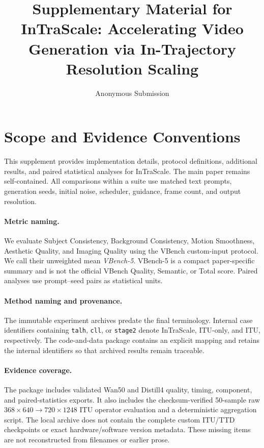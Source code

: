 \documentclass[letterpaper]{article}
\title{Supplementary Material for\\
InTraScale: Accelerating Video Generation via In-Trajectory Resolution Scaling}
\author{Anonymous Submission}
\begin{document}
\maketitle

\section{Scope and Evidence Conventions}

This supplement provides implementation details, protocol definitions,
additional results, and paired statistical analyses for InTraScale.  The main
paper remains self-contained.  All comparisons within a suite use matched text
prompts, generation seeds, initial noise, scheduler, guidance, frame count, and
output resolution.

\paragraph{Metric naming.}
We evaluate Subject Consistency, Background Consistency, Motion Smoothness,
Aesthetic Quality, and Imaging Quality using the VBench custom-input protocol.
We call their unweighted mean \emph{VBench-5}.  VBench-5 is a compact
paper-specific summary and is not the official VBench Quality, Semantic, or
Total score.  Paired analyses use prompt--seed pairs as statistical units.

\paragraph{Method naming and provenance.}
The immutable experiment archives predate the final terminology.  Internal
case identifiers containing \texttt{talh}, \texttt{cll}, or \texttt{stage2}
denote InTraScale, ITU-only, and ITU, respectively.  The code-and-data package
contains an explicit mapping and retains the internal identifiers so that
archived results remain traceable.

\paragraph{Evidence coverage.}
The package includes validated Wan50 and Distill4 quality, timing, component,
and paired-statistics exports.  It also includes the checksum-verified
50-sample raw \(368{\times}640\rightarrow720{\times}1248\) ITU operator
evaluation and a deterministic aggregation script.  The local archive does not
contain the complete custom ITU/TTD checkpoints or exact hardware/software
version metadata.  These missing items are not reconstructed from filenames or
earlier prose.
\end{document}

